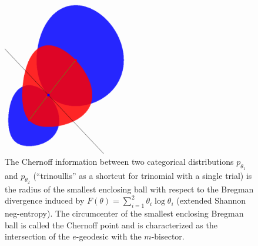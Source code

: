 \documentclass[11pt]{article}
\begin{document}
\begin{figure}
\centering
\includegraphics[width=0.5\textwidth]{ChernoffEKL-1.png}

\caption{The Chernoff information between two categorical distributions $p_{\theta_1}$ and $p_{\theta_2}$ (``trinoullis'' as a shortcut for trinomial with a single trial) is the radius of the smallest enclosing ball with respect to the Bregman divergence induced by  $F(\theta)=\sum_{i=1}^2 \theta_i\log\theta_i$ (extended Shannon neg-entropy).
The circumcenter of the smallest enclosing Bregman ball is called the Chernoff point and is characterized as the intersection of the $e$-geodesic with the $m$-bisector.
 }\label{figChernoffEKL-1.png:}
\end{figure} 

\end{document}
